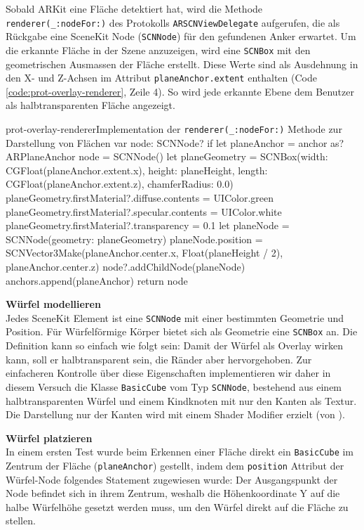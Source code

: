 \begin{description}
	Sobald ARKit eine Fläche detektiert hat, wird die Methode \texttt{renderer(\_:nodeFor:)} des Protokolls \texttt{ARSCNViewDelegate} aufgerufen, die als Rückgabe eine SceneKit Node (\texttt{SCNNode}) für den gefundenen Anker erwartet. Um die erkannte Fläche in der Szene anzuzeigen, wird eine \texttt{SCNBox} mit den geometrischen Ausmassen der Fläche erstellt. Diese Werte sind als Ausdehnung in den X- und Z-Achsen im Attribut \texttt{planeAnchor.extent} enthalten (Code \ref{code:prot-overlay-renderer}, Zeile 4). So wird jede erkannte Ebene dem Benutzer als halbtransparenten Fläche angezeigt.

	\begin{code}{prot-overlay-renderer}{Implementation der \texttt{renderer(\_:nodeFor:)} Methode zur Darstellung von Flächen}
		var node:  SCNNode?
		if let planeAnchor = anchor as? ARPlaneAnchor {
			node = SCNNode()
			let planeGeometry = SCNBox(width: CGFloat(planeAnchor.extent.x), height: planeHeight, length: CGFloat(planeAnchor.extent.z), chamferRadius: 0.0)
			planeGeometry.firstMaterial?.diffuse.contents = UIColor.green
			planeGeometry.firstMaterial?.specular.contents = UIColor.white
			planeGeometry.firstMaterial?.transparency = 0.1
			let planeNode = SCNNode(geometry: planeGeometry)
			planeNode.position = SCNVector3Make(planeAnchor.center.x, Float(planeHeight / 2), planeAnchor.center.z)
			node?.addChildNode(planeNode)
			anchors.append(planeAnchor)
		}
		return node
	\end{code}

	\textbf{Würfel modellieren}\\
	Jedes SceneKit Element ist eine \texttt{SCNNode} mit einer bestimmten Geometrie und Position. Für Würfelförmige Körper bietet sich als Geometrie eine \texttt{SCNBox} an. Die Definition kann so einfach wie folgt sein:
	Damit der Würfel als Overlay wirken kann, soll er halbtransparent sein, die Ränder aber hervorgehoben. Zur einfacheren Kontrolle über diese Eigenschaften implementieren wir daher in diesem Versuch die Klasse \texttt{BasicCube} vom Typ \texttt{SCNNode}, bestehend aus einem halbtransparenten Würfel und einem Kindknoten mit nur den Kanten als Textur. Die Darstellung nur der Kanten wird mit einem Shader Modifier erzielt (von \cite{so-shader-modifier}).

	\textbf{Würfel platzieren}\\
	In einem ersten Test wurde beim Erkennen einer Fläche direkt ein \texttt{BasicCube} im Zentrum der Fläche (\texttt{planeAnchor}) gestellt, indem dem \texttt{position} Attribut der Würfel-Node folgendes Statement zugewiesen wurde:
	Der Ausgangspunkt der Node befindet sich in ihrem Zentrum, weshalb die Höhenkoordinate Y auf die halbe Würfelhöhe gesetzt werden muss, um den Würfel direkt auf die Fläche zu stellen.


\end{description}
